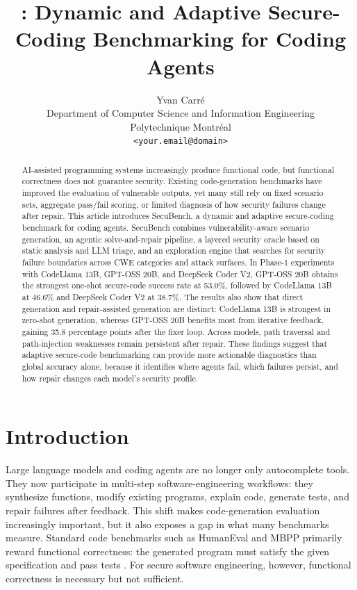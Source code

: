 \documentclass[11pt]{article}
\title{\toolname: Dynamic and Adaptive Secure-Coding Benchmarking for Coding Agents}
\author{
Yvan Carré\\
Department of Computer Science and Information Engineering\\
Polytechnique Montréal\\
\texttt{<your.email@domain>}
}
\date{}
\newcommand{\toolname}{SecuBench}
\newcommand{\pp}{percentage points}
\begin{document}
\maketitle


\begin{abstract}
AI-assisted programming systems increasingly produce functional code, but functional correctness does not guarantee security. Existing code-generation benchmarks have improved the evaluation of vulnerable outputs, yet many still rely on fixed scenario sets, aggregate pass/fail scoring, or limited diagnosis of how security failures change after repair. This article introduces \toolname{}, a dynamic and adaptive secure-coding benchmark for coding agents. \toolname{} combines vulnerability-aware scenario generation, an agentic solve-and-repair pipeline, a layered security oracle based on static analysis and LLM triage, and an exploration engine that searches for security failure boundaries across CWE categories and attack surfaces. In Phase-1 experiments with CodeLlama 13B, GPT-OSS 20B, and DeepSeek Coder V2, GPT-OSS 20B obtains the strongest one-shot secure-code success rate at 53.0\%, followed by CodeLlama 13B at 46.6\% and DeepSeek Coder V2 at 38.7\%. The results also show that direct generation and repair-assisted generation are distinct: CodeLlama 13B is strongest in zero-shot generation, whereas GPT-OSS 20B benefits most from iterative feedback, gaining 35.8 \pp{} after the fixer loop. Across models, path traversal and path-injection weaknesses remain persistent after repair. These findings suggest that adaptive secure-code benchmarking can provide more actionable diagnostics than global accuracy alone, because it identifies where agents fail, which failures persist, and how repair changes each model's security profile.
\end{abstract}


\section{Introduction}

Large language models and coding agents are no longer only autocomplete tools. They now participate in multi-step software-engineering workflows: they synthesize functions, modify existing programs, explain code, generate tests, and repair failures after feedback. This shift makes code-generation evaluation increasingly important, but it also exposes a gap in what many benchmarks measure. Standard code benchmarks such as HumanEval and MBPP primarily reward functional correctness: the generated program must satisfy the given specification and pass tests \cite{chen2021codex,austin2021programsynthesis}. For secure software engineering, however, functional correctness is necessary but not sufficient.
\end{document}
